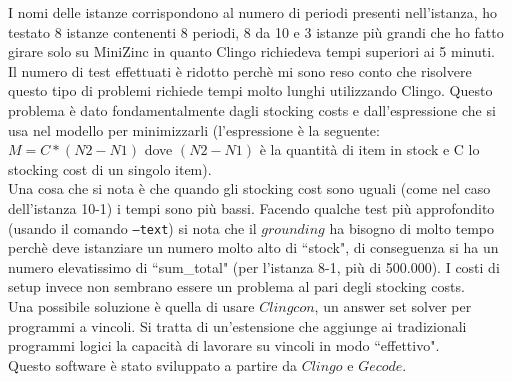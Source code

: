 \documentclass[12pt]{article}
\begin{document}
\noindent I nomi delle istanze corrispondono al numero di periodi presenti nell'istanza, ho testato 8 istanze contenenti 8 periodi, 8 da 10 e 3 istanze più grandi che ho fatto girare solo su MiniZinc in quanto Clingo richiedeva tempi superiori ai 5 minuti.\\
Il numero di test effettuati è ridotto perchè mi sono reso conto che risolvere questo tipo di problemi richiede tempi molto lunghi utilizzando Clingo. Questo problema è dato fondamentalmente dagli stocking costs e dall'espressione che si usa nel modello per minimizzarli (l'espressione è la seguente: $M = C*(N2-N1)$ dove $(N2-N1)$ è la quantità di item in stock e C lo stocking cost di un singolo item).\\
Una cosa che si nota è che quando gli stocking cost sono uguali (come nel caso dell'istanza 10-1) i tempi sono più bassi. Facendo qualche test più approfondito (usando il comando \texttt{--text}) si nota che il $grounding$ ha bisogno di molto tempo perchè deve istanziare un numero molto alto di ``stock", di conseguenza si ha un numero elevatissimo di ``sum\_total" (per l'istanza 8-1, più di 500.000). I costi di setup invece non sembrano essere un problema al pari degli stocking costs.\\

\noindent Una possibile soluzione è quella di usare $Clingcon$, un answer set solver per programmi a vincoli. Si tratta di un'estensione che aggiunge ai tradizionali programmi logici la capacità di lavorare su vincoli in modo ``effettivo".\\
Questo software è stato sviluppato a partire da $Clingo$ e $Gecode$.
\end{document}
